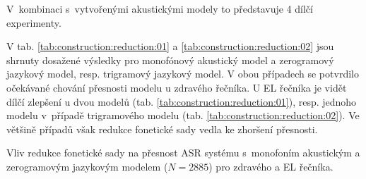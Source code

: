 \noindent V~kombinaci s~vytvořenými akustickými modely to představuje 4 dílčí experimenty.

V tab. \ref{tab:construction:reduction:01} a \ref{tab:construction:reduction:02} jsou shrnuty dosažené výsledky pro monofónový akustický model a zerogramový jazykový model, resp. trigramový jazykový model.
V obou případech se potvrdilo očekávané chování přesnosti modelu u zdravého řečníka.
U EL řečníka je vidět dílčí zlepšení u dvou modelů (tab. \ref{tab:construction:reduction:01}), resp. jednoho modelu v~případě trigramového modelu (tab. \ref{tab:construction:reduction:02}).
Ve většině případů však redukce fonetické sady vedla ke zhoršení přesnosti.


\begin{table}[htpb]
  \centering
  \def\arraystretch{1.5}
  \caption[Vliv redukce na přesnost ASR s~mono. AM. a zerogram LM.]{Vliv redukce fonetické sady na přesnost ASR systému s~monofoním akustickým a zerogramovým jazykovým modelem ($N=2885$) pro zdravého a EL řečníka.}
  \label{tab:construction:reduction:01}
\end{table}

